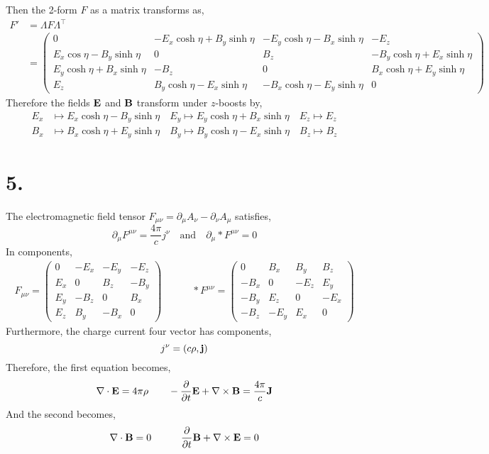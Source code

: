 \documentclass[12pt]{article}
\begin{document}
Then the 2-form $F$ as a matrix transforms as,
\begin{align*}
F' & = \Lambda F \Lambda^\top 
\\
& = 
\begin{pmatrix}
0 & - E_x \cosh{\eta} + B_y \sinh{\eta} & - E_y \cosh{\eta} - B_x \sinh{\eta} & - E_z
\\
E_x \cos{\eta} - B_y \sinh{\eta} & 0 & B_z & - B_y \cosh{\eta} + E_x \sinh{\eta}
\\
E_y \cosh{\eta} + B_x \sinh{\eta} & - B_z & 0 & B_x \cosh{\eta} + E_y \sinh{\eta}
\\
E_z  & B_y \cosh{\eta} - E_x \sinh{\eta} & - B_x \cosh{\eta} - E_y \sinh{\eta} & 0
\end{pmatrix}
\end{align*}
Therefore the fields $\bf{E}$ and $\bf{B}$ transform under $z$-boosts by,
\begin{align*}
E_x & \mapsto E_x \cosh{\eta} - B_y \sinh{\eta} \quad E_y \mapsto E_y \cosh{\eta} + B_x \sinh{\eta} \quad E_z \mapsto E_z 
\\
B_x & \mapsto B_x \cosh{\eta} + E_y \sinh{\eta} \quad B_y \mapsto B_y \cosh{\eta} - E_x \sinh{\eta} \quad B_z \mapsto B_z
\end{align*}
\section*{5.}

The electromagnetic field tensor $F_{\mu \nu} = \partial_\mu A_\nu - \partial_\nu A_\mu$ satisfies,
\[ \partial_\mu F^{\mu \nu} = \frac{4 \pi}{c} j^\nu \quad \text{and} \quad \partial_{\mu} * F^{\mu \nu} = 0 \]
In components, 
\begin{align*}
F_{\mu \nu} =
\begin{pmatrix}
0 & - E_x & - E_y & - E_z
\\
E_x & 0 & B_z & - B_y
\\
E_y & - B_z & 0 & B_x
\\
E_z & B_y & - B_x & 0
\end{pmatrix}
\quad \quad \quad
* F^{\mu \nu} =
\begin{pmatrix}
0 & B_x & B_y & B_z
\\
- B_x & 0 & -E_z & E_y
\\
- B_y & E_z & 0 & -E_x
\\
- B_z & -E_y & E_x & 0
\end{pmatrix}
\end{align*}
Furthermore, the charge current four vector has components,
\[ j^\nu = (c \rho, \bf{j}) \]
Therefore, the first equation becomes,
\[ \nabla \cdot \bf{E} = 4 \pi \rho \quad \quad - \pderiv{}{t} \bf{E} + \nabla \times \bf{B} = \frac{4 \pi}{c} \bf{J} \]
And the second becomes,
\[ \nabla \cdot \bf{B} = 0 \quad \quad \quad \pderiv{}{t} \bf{B} + \nabla \times \bf{E} = 0 \]
\end{document}
